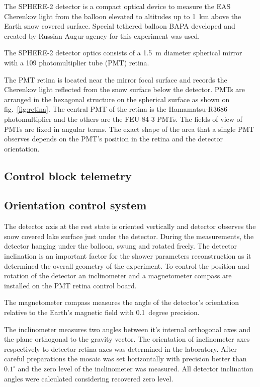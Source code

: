 \documentclass[final,5p,times,twocolumn]{elsarticle}
\begin{document}
The \mbox{SPHERE-2} detector is a compact optical device to measure the EAS Cherenkov light from the balloon elevated to altitudes up to 1~km above the Earth snow covered surface. Special tethered balloon BAPA developed and created by Russian Augur agency for this experiment was used.

The \mbox{SPHERE-2} detector optics consists of a 1.5~m diameter spherical mirror with a 109 photomultiplier tube (PMT) retina. 

The PMT retina is located near the mirror focal surface and records the Cherenkov light reflected from the snow surface below the detector. PMTs are arranged in the hexagonal structure on the spherical surface as shown on fig.~\ref{fig:retina}. The central PMT of the retina is the Hamamatsu-R3686 photomultiplier and the others are the FEU-84-3 PMTs. The fields of view of PMTs are fixed in angular terms. The exact shape of the area that a single PMT observes depends on the PMT's position in the retina and the detector orientation.

\subsection{Control block telemetry}

\subsection{Orientation control system}

The detector axis at the rest state is oriented vertically and detector observes the snow covered lake surface just under the detector. During the measurements, the detector hanging under the balloon, swung and rotated freely. The detector inclination is an important factor for the shower parameters reconstruction as it determined the overall geometry of the experiment. To control the position and rotation of the detector an inclinometer and a magnetometer compass are installed on the PMT retina control board. 

The magnetometer compass measures the angle of the detector's orientation relative to the Earth's magnetic field with 0.1~degree precision.

The inclinometer measures two angles between it's internal orthogonal axes and the plane orthogonal to the gravity vector. The orientation of inclinometer axes respectively to detector retina axes was determined in the laboratory. After careful preparations the mosaic was set horizontally with precision better than $0.1^\circ$ and the zero level of the inclinometer was measured. All detector inclination angles were calculated considering recovered zero level.
\end{document}
